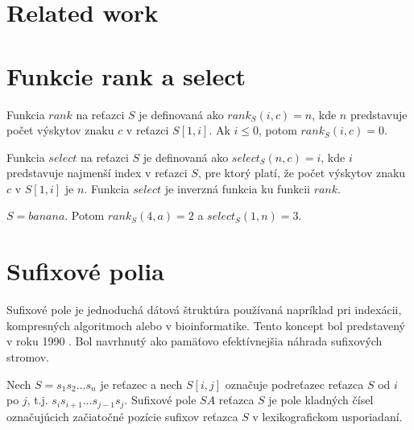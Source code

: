\newpage %

\section{Related work}



\section{Funkcie rank a select}
\begin{defn}
    Funkcia $rank$ na reťazci $S$ je definovaná ako $rank_S(i, c) = n$, kde $n$
    predstavuje počet výskytov znaku $c$ v reťazci $S[1, i]$. Ak $i \leq 0$,
    potom $rank_S(i, c) = 0$.
\end{defn}

\begin{defn}
    Funkcia $select$ na reťazci $S$ je definovaná ako $select_S(n, c) = i$, kde
    $i$ predstavuje najmenší index v reťazci $S$, pre ktorý platí, že počet
    výskytov znaku $c$ v $S[1, i]$ je $n$. Funkcia $select$ je inverzná funkcia
    ku funkcii $rank$.
\end{defn}

\begin{example}
    $S = banana$. Potom $rank_S(4, a) = 2$ a $select_S(1, n) = 3$.
\end{example}


\section{Sufixové polia}

Sufixové pole je jednoduchá dátová štruktúra používaná napríklad pri indexácii,
kompresných algoritmoch alebo v bioinformatike. Tento koncept bol predstavený v
roku 1990 \cite{MM90}. Bol navrhnutý ako pamäťovo efektívnejšia náhrada
sufixových stromov.

\begin{defn}
    Nech $S = s_1 s_2 \ldots s_n$ je reťazec a nech $S[i, j]$ označuje
    podreťazec reťazca $S$ od $i$ po $j$, t.j. $s_i s_{i+1} \ldots s_{j-1} s_j$.
    Sufixové pole $SA$ reťazca $S$ je pole kladných čísel označujúcich začiatočné pozície sufixov reťazca $S$ v
    lexikografickom usporiadaní.
\end{defn}

